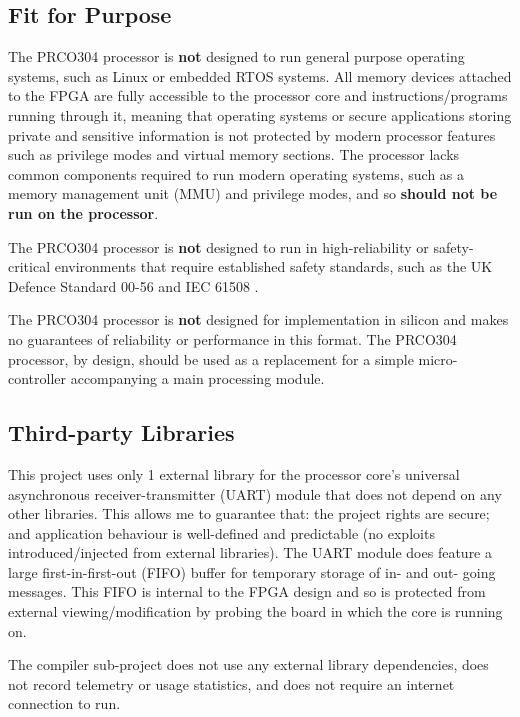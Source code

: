 \documentclass[11pt,a4paper]{report}
\newcommand{\scname}{PRCO304}
\begin{document}
\subsection{Fit for Purpose}
The \scname{} processor is \textbf{not} designed to run general purpose operating systems, such as Linux or embedded RTOS systems. All memory devices attached to the FPGA are fully accessible to the processor core and instructions/programs running through it, meaning that operating systems or secure applications storing private and sensitive information is not protected by modern processor features such as privilege modes and virtual memory sections. The processor lacks common components required to run modern operating systems, such as a memory management unit (MMU) and privilege modes, and so \textbf{should not be run on the processor}.

The \scname{} processor is \textbf{not} designed to run in high-reliability or safety-critical environments that require established safety standards, such as the UK Defence Standard 00-56 \cite{defstan_0056_2} and IEC 61508 \cite{iec61508}.

The \scname{} processor is \textbf{not} designed for implementation in silicon and makes no guarantees of reliability or performance in this format. The \scname{} processor, by design, should be used as a replacement for a simple micro-controller accompanying a main processing module.

\subsection{Third-party Libraries}
This project uses only 1 external library for the processor core's universal asynchronous receiver-transmitter (UART) module that does not depend on any other libraries. This allows me to guarantee that: the project rights are secure; and application behaviour is well-defined and predictable (no exploits introduced/injected from external libraries). The UART module does feature a large first-in-first-out (FIFO) buffer for temporary storage of in- and out- going messages. This FIFO is internal to the FPGA design and so is protected from external viewing/modification by probing the board in which the core is running on.

The compiler sub-project does not use any external library dependencies, does not record telemetry or usage statistics, and does not require an internet connection to run.
\end{document}
